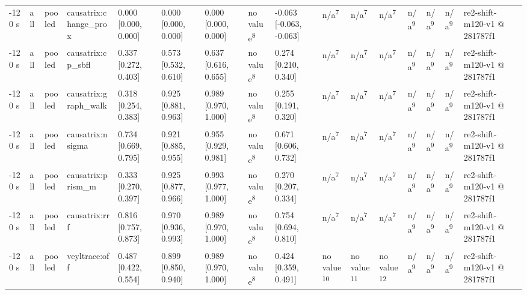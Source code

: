 \begin{table}[t]
\begin{tabular}{llllllllllllllll}
-120 s & all & pooled & causatrix:change\_prox & 0.000 [0.000, 0.000] & 0.000 [0.000, 0.000] & 0.000 [0.000, 0.000] & no value\textsuperscript{8} & -0.063 [-0.063, -0.063] & n/a\textsuperscript{7} & n/a\textsuperscript{7} & n/a\textsuperscript{7} & n/a\textsuperscript{9} & n/a\textsuperscript{9} & n/a\textsuperscript{9} & re2-shift-m120-v1 @ 281787f1 \\
-120 s & all & pooled & causatrix:cp\_sbfl & 0.337 [0.272, 0.403] & 0.573 [0.532, 0.610] & 0.637 [0.616, 0.655] & no value\textsuperscript{8} & 0.274 [0.210, 0.340] & n/a\textsuperscript{7} & n/a\textsuperscript{7} & n/a\textsuperscript{7} & n/a\textsuperscript{9} & n/a\textsuperscript{9} & n/a\textsuperscript{9} & re2-shift-m120-v1 @ 281787f1 \\
-120 s & all & pooled & causatrix:graph\_walk & 0.318 [0.254, 0.383] & 0.925 [0.881, 0.963] & 0.989 [0.970, 1.000] & no value\textsuperscript{8} & 0.255 [0.191, 0.320] & n/a\textsuperscript{7} & n/a\textsuperscript{7} & n/a\textsuperscript{7} & n/a\textsuperscript{9} & n/a\textsuperscript{9} & n/a\textsuperscript{9} & re2-shift-m120-v1 @ 281787f1 \\
-120 s & all & pooled & causatrix:nsigma & 0.734 [0.669, 0.795] & 0.921 [0.885, 0.955] & 0.955 [0.929, 0.981] & no value\textsuperscript{8} & 0.671 [0.606, 0.732] & n/a\textsuperscript{7} & n/a\textsuperscript{7} & n/a\textsuperscript{7} & n/a\textsuperscript{9} & n/a\textsuperscript{9} & n/a\textsuperscript{9} & re2-shift-m120-v1 @ 281787f1 \\
-120 s & all & pooled & causatrix:prism\_m & 0.333 [0.270, 0.397] & 0.925 [0.877, 0.966] & 0.993 [0.977, 1.000] & no value\textsuperscript{8} & 0.270 [0.207, 0.334] & n/a\textsuperscript{7} & n/a\textsuperscript{7} & n/a\textsuperscript{7} & n/a\textsuperscript{9} & n/a\textsuperscript{9} & n/a\textsuperscript{9} & re2-shift-m120-v1 @ 281787f1 \\
-120 s & all & pooled & causatrix:rrf & 0.816 [0.757, 0.873] & 0.970 [0.936, 0.993] & 0.989 [0.970, 1.000] & no value\textsuperscript{8} & 0.754 [0.694, 0.810] & n/a\textsuperscript{7} & n/a\textsuperscript{7} & n/a\textsuperscript{7} & n/a\textsuperscript{9} & n/a\textsuperscript{9} & n/a\textsuperscript{9} & re2-shift-m120-v1 @ 281787f1 \\
-120 s & all & pooled & veyltrace:off & 0.487 [0.422, 0.554] & 0.899 [0.850, 0.940] & 0.989 [0.970, 1.000] & no value\textsuperscript{8} & 0.424 [0.359, 0.491] & no value\textsuperscript{10} & no value\textsuperscript{11} & no value\textsuperscript{12} & n/a\textsuperscript{9} & n/a\textsuperscript{9} & n/a\textsuperscript{9} & re2-shift-m120-v1 @ 281787f1 \\

\end{tabular}
\end{table}
